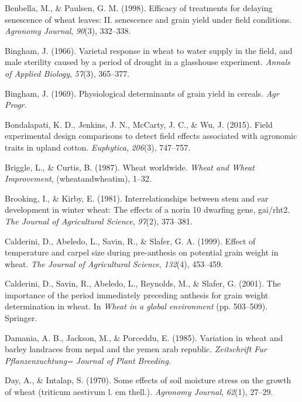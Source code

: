 \documentclass[12pt,oneside]{dukestatscithesis} %
\theoremstyle{definition}
\theoremstyle{definition}
\theoremstyle{definition}
\theoremstyle{remark}
\begin{document}
\hypertarget{ref-benbella1998efficacy}{}
Benbella, M., \& Paulsen, G. M. (1998). Efficacy of treatments for
delaying senescence of wheat leaves: II. senescence and grain yield
under field conditions. \emph{Agronomy Journal}, \emph{90}(3), 332--338.

\hypertarget{ref-bingham1966varietal}{}
Bingham, J. (1966). Varietal response in wheat to water supply in the
field, and male sterility caused by a period of drought in a glasshouse
experiment. \emph{Annals of Applied Biology}, \emph{57}(3), 365--377.

\hypertarget{ref-bingham1969physiological}{}
Bingham, J. (1969). Physiological determinants of grain yield in
cereals. \emph{Agr Progr}.

\hypertarget{ref-bondalapati2015field}{}
Bondalapati, K. D., Jenkins, J. N., McCarty, J. C., \& Wu, J. (2015).
Field experimental design comparisons to detect field effects associated
with agronomic traits in upland cotton. \emph{Euphytica}, \emph{206}(3),
747--757.

\hypertarget{ref-briggle1987wheat}{}
Briggle, L., \& Curtis, B. (1987). Wheat worldwide. \emph{Wheat and
Wheat Improvement}, (wheatandwheatim), 1--32.

\hypertarget{ref-brooking1981interrelationships}{}
Brooking, I., \& Kirby, E. (1981). Interrelationships between stem and
ear development in winter wheat: The effects of a norin 10 dwarfing
gene, gai/rht2. \emph{The Journal of Agricultural Science},
\emph{97}(2), 373--381.

\hypertarget{ref-calderini1999effect}{}
Calderini, D., Abeledo, L., Savin, R., \& Slafer, G. A. (1999). Effect
of temperature and carpel size during pre-anthesis on potential grain
weight in wheat. \emph{The Journal of Agricultural Science},
\emph{132}(4), 453--459.

\hypertarget{ref-calderini2001importance}{}
Calderini, D., Savin, R., Abeledo, L., Reynolds, M., \& Slafer, G.
(2001). The importance of the period immediately preceding anthesis for
grain weight determination in wheat. In \emph{Wheat in a global
environment} (pp. 503--509). Springer.

\hypertarget{ref-damania1985variation}{}
Damania, A. B., Jackson, M., \& Porceddu, E. (1985). Variation in wheat
and barley landraces from nepal and the yemen arab republic.
\emph{Zeitschrift Fur Pflanzenzuchtung= Journal of Plant Breeding}.

\hypertarget{ref-day1970some}{}
Day, A., \& Intalap, S. (1970). Some effects of soil moisture stress on
the growth of wheat (triticum aestivum l. em thell.). \emph{Agronomy
Journal}, \emph{62}(1), 27--29.
\end{document}
